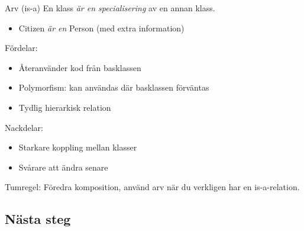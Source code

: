 \begin{frame}[fragile]
  \begin{block}{Arv (is-a)}
    En klass \emph{är en specialisering} av en annan klass.
    \begin{itemize}
      \item Citizen \emph{är en} Person (med extra information)
    \end{itemize}
    
    Fördelar:
    \begin{itemize}
      \item Återanvänder kod från basklassen
      \item Polymorfism: kan användas där basklassen förväntas
      \item Tydlig hierarkisk relation
    \end{itemize}
    
    Nackdelar:
    \begin{itemize}
      \item Starkare koppling mellan klasser
      \item Svårare att ändra senare
    \end{itemize}
  \end{block}
\end{frame}

Tumregel: Föredra komposition, använd arv när du verkligen har en 
is-a-relation.

\subsection{Nästa steg}

